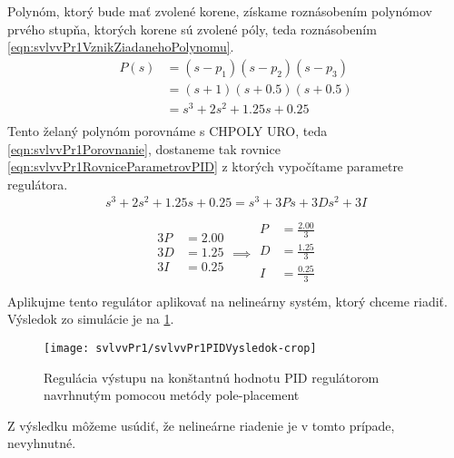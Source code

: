 \documentclass[../main.tex]{subfiles}
\begin{document}
	Polynóm, ktorý bude mať zvolené korene, získame roznásobením polynómov prvého stupňa, ktorých korene sú zvolené póly, teda roznásobením \cref{eqn:svlvvPr1VznikZiadanehoPolynomu}. 
		\begin{equation}
	\begin{aligned}
	P(s) &= (s - p_1)(s - p_2)(s - p_3) \\
		 &= (s + 1)(s + 0.5)(s + 0.5) \\
		 &= s^3 + 2s^2 + 1.25s + 0.25\\
	\end{aligned}
	\label{eqn:svlvvPr1VznikZiadanehoPolynomu}
	\end{equation}
	Tento želaný polynóm porovnáme s CHPOLY URO, teda \cref{eqn:svlvvPr1Porovnanie}, dostaneme tak rovnice \cref{eqn:svlvvPr1RovniceParametrovPID} z ktorých vypočítame parametre regulátora.
	\begin{equation}
	\begin{aligned}
		s^3 + 2s^2 + 1.25s + 0.25= s^3 + 3Ps + 3Ds^2 + 3I\\
	\end{aligned}
	\label{eqn:svlvvPr1Porovnanie}
	\end{equation}
	\begin{equation}
	\begin{aligned}
		\begin{matrix}
		3P &= 2.00 \\
		3D &= 1.25 \\ 
		3I &= 0.25 \\
		\end{matrix}
		\implies 
		\begin{matrix}
		P &= \frac{2.00}{3} \\
		D &= \frac{1.25}{3} \\ 
		I &= \frac{0.25}{3}  \\
		\end{matrix}
	\end{aligned}
	\label{eqn:svlvvPr1RovniceParametrovPID}
	\end{equation}
	Aplikujme tento regulátor aplikovať na nelineárny systém, ktorý chceme riadiť. Výsledok zo simulácie je na \cref{fig:svlvPr1VysledokPID}.
		\begin{figure}[h!]
			\centering
		\texttt{[image: svlvvPr1/svlvvPr1PIDVysledok-crop]}
		\caption{Regulácia výstupu na konštantnú hodnotu PID regulátorom navrhnutým pomocou metódy pole-placement}
		\label{fig:svlvPr1VysledokPID}
	\end{figure}
	Z výsledku môžeme usúdiť, že nelineárne riadenie je v tomto prípade, nevyhnutné.
\end{document}
